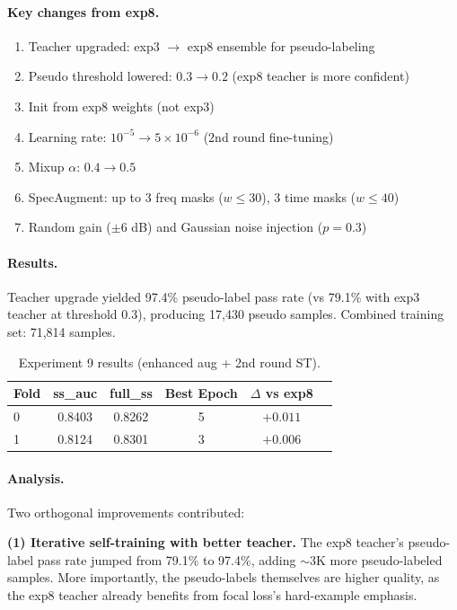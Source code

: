 \paragraph{Key changes from exp8.}
\begin{enumerate}
    \item Teacher upgraded: exp3 $\to$ exp8 ensemble for pseudo-labeling
    \item Pseudo threshold lowered: $0.3 \to 0.2$ (exp8 teacher is more confident)
    \item Init from exp8 weights (not exp3)
    \item Learning rate: $10^{-5} \to 5 \times 10^{-6}$ (2nd round fine-tuning)
    \item Mixup $\alpha$: $0.4 \to 0.5$
    \item SpecAugment: up to 3 freq masks ($w \leq 30$), 3 time masks ($w \leq 40$)
    \item Random gain ($\pm 6$ dB) and Gaussian noise injection ($p=0.3$)
\end{enumerate}

\paragraph{Results.}
Teacher upgrade yielded 97.4\% pseudo-label pass rate (vs 79.1\% with exp3
teacher at threshold 0.3), producing 17,430 pseudo samples.
Combined training set: 71,814 samples.

\begin{table}[h]
\centering
\caption{Experiment 9 results (enhanced aug + 2nd round ST).}
\label{tab:exp9}
\begin{tabular}{lccccc}
\hline
\textbf{Fold} & \textbf{ss\_auc} & \textbf{full\_ss} & \textbf{Best Epoch} & \textbf{$\Delta$ vs exp8} \\
\hline
0 & 0.8403 & 0.8262 & 5 & $+0.011$ \\
1 & 0.8124 & 0.8301 & 3 & $+0.006$ \\
\hline
\end{tabular}
\end{table}

\paragraph{Analysis.}
Two orthogonal improvements contributed:

\textbf{(1) Iterative self-training with better teacher.}
The exp8 teacher's pseudo-label pass rate jumped from 79.1\% to 97.4\%,
adding $\sim$3K more pseudo-labeled samples. More importantly, the
pseudo-labels themselves are higher quality, as the exp8 teacher already
benefits from focal loss's hard-example emphasis.

